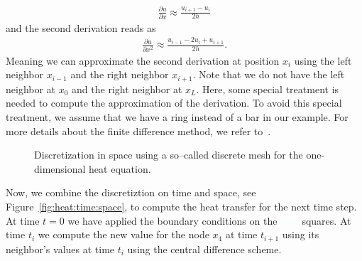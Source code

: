 \begin{align*}
\frac{\partial u}{\partial x} \approx \frac{u_{i+1}-u_{i}}{2h}
\end{align*}
and the second derivation reads as
\begin{align*}
\frac{\partial u}{\partial x^2} \approx \frac{u_{i-1}-2u_{i}+u_{i+1}}{2h}\text{.}
\end{align*}
Meaning we can approximate the second derivation at position $x_i$ using the left neighbor $x_{i-1}$ and the right neighbor $x_{i+1}$. Note that we do not have the left neighbor at $x_0$ and the right neighbor at $x_L$. Here, some special treatment is needed to compute the approximation of the derivation. To avoid this special treatment, we assume that we have a ring instead of a bar in our example. For more details about the finite difference method, we refer to~\cite{strikwerda2004finite,leveque2007finite}.
\begin{figure}[tb]
\center
{}
\caption{Discretization in space using a so--called discrete mesh for the one-dimensional heat equation.}
\label{fig:heat:discrete:mesh}
\end{figure}
Now, we combine the discretiztion on time and space, see Figure~\ref{fig:heat:time:space}, to compute the heat transfer for the next time step. At time $t=0$ we have applied the boundary conditions on the \textcolor{azure}{blue} squares. At time $t_i$ we compute the new value for the node $x_4$ at time $t_{i+1}$ using its neighbor's values at time $t_i$ using the central difference scheme. 

